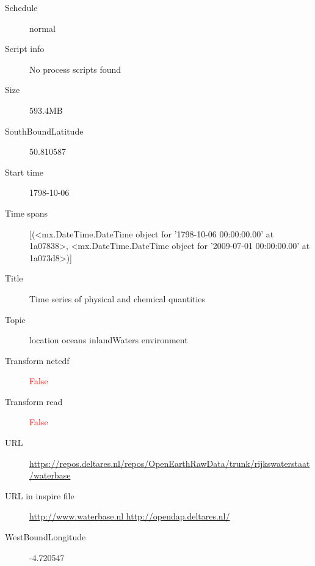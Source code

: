\documentclass[9]{report}
\begin{document}
\begin{description}
\begin{verbatim}
\end{verbatim}
  \item[Schedule] normal
  \item[Script info] No process scripts found
  \item[Size] 593.4MB
  \item[SouthBoundLatitude] 50.810587
  \item[Start time] 1798-10-06
  \item[Time spans] [(<mx.DateTime.DateTime object for '1798-10-06 00:00:00.00' at 1a07838>, <mx.DateTime.DateTime object for '2009-07-01 00:00:00.00' at 1a073d8>)]
  \item[Title]  Time series of physical and chemical quantities 
  \item[Topic] location oceans inlandWaters environment
  \item[Transform netcdf] \textcolor{red}{False}
  \item[Transform read] \textcolor{red}{False}
  \item[URL] \href{https://repos.deltares.nl/repos/OpenEarthRawData/trunk/rijkswaterstaat/waterbase}{https://repos.deltares.nl/repos/OpenEarthRawData/trunk/rijkswaterstaat/waterbase}
  \item[URL in inspire file] \href{http://www.waterbase.nl http://opendap.deltares.nl/}{http://www.waterbase.nl http://opendap.deltares.nl/}
  \item[WestBoundLongitude] -4.720547
\end{description}
\end{document}
